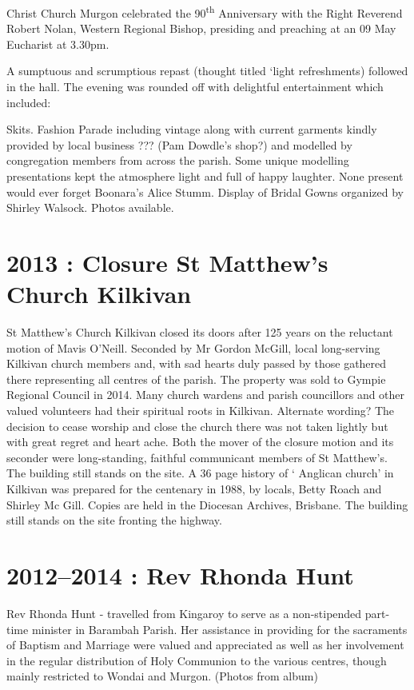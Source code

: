 Christ Church Murgon celebrated the 90\textsuperscript{th} Anniversary
with the Right Reverend Robert Nolan, Western Regional Bishop, presiding
and preaching at an 09 May Eucharist at 3.30pm.

A sumptuous and scrumptious repast (thought titled `light refreshments)
followed in the hall. The evening was rounded off with delightful
entertainment which included:

Skits. Fashion Parade including vintage along with current garments
kindly provided by local business ??? (Pam Dowdle's shop?) and modelled
by congregation members from across the parish. Some unique modelling
presentations kept the atmosphere light and full of happy laughter. None
present would ever forget Boonara's Alice Stumm. Display of Bridal Gowns
organized by Shirley Walsock. Photos available.

\hypertarget{closure-st-matthews-church-kilkivan}{%
\section{2013 : Closure St Matthew's Church
Kilkivan}\label{closure-st-matthews-church-kilkivan}}

St Matthew's Church Kilkivan closed its doors after 125 years on the
reluctant motion of Mavis O'Neill. Seconded by Mr Gordon McGill, local
long-serving Kilkivan church members and, with sad hearts duly passed by
those gathered there representing all centres of the parish. The
property was sold to Gympie Regional Council in 2014. Many church
wardens and parish councillors and other valued volunteers had their
spiritual roots in Kilkivan. Alternate wording? The decision to cease
worship and close the church there was not taken lightly but with great
regret and heart ache. Both the mover of the closure motion and its
seconder were long-standing, faithful communicant members of St
Matthew's. The building still stands on the site. A 36 page history of `
Anglican church' in Kilkivan was prepared for the centenary in 1988, by
locals, Betty Roach and Shirley Mc Gill. Copies are held in the Diocesan
Archives, Brisbane. The building still stands on the site fronting the
highway.

\hypertarget{rev-rhonda-hunt}{%
\section{2012--2014 : Rev Rhonda Hunt}\label{rev-rhonda-hunt}}

Rev Rhonda Hunt - travelled from Kingaroy to serve as a non-stipended
part-time minister in Barambah Parish. Her assistance in providing for
the sacraments of Baptism and Marriage were valued and appreciated as
well as her involvement in the regular distribution of Holy Communion to
the various centres, though mainly restricted to Wondai and Murgon.
(Photos from album)

